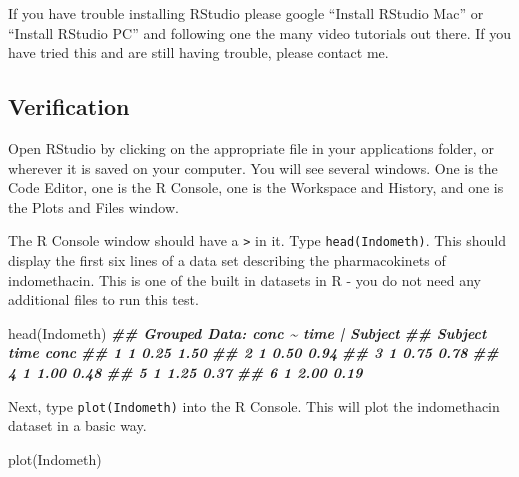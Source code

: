 \documentclass[
]{krantz}
\newenvironment{Shaded}{\begin{snugshade}}{\end{snugshade}}
\newcommand{\DocumentationTok}[1]{\textcolor[rgb]{0.56,0.35,0.01}{\textbf{\textit{#1}}}}
\newcommand{\FunctionTok}[1]{\textcolor[rgb]{0.00,0.00,0.00}{#1}}
\newcommand{\NormalTok}[1]{#1}
\begin{document}
If you have trouble installing RStudio please google ``Install RStudio Mac'' or ``Install RStudio PC'' and following one the many video tutorials out there. If you have tried this and are still having trouble, please contact me.

\hypertarget{verification}{%
\subsection{Verification}\label{verification}}

Open RStudio by clicking on the appropriate file in your applications folder, or wherever it is saved on your computer. You will see several windows. One is the Code Editor, one is the R Console, one is the Workspace and History, and one is the Plots and Files window.

The R Console window should have a \texttt{\textgreater{}} in it. Type \texttt{head(Indometh)}. This should display the first six lines of a data set describing the pharmacokinets of indomethacin. This is one of the built in datasets in R - you do not need any additional files to run this test.

\begin{Shaded}
\begin{Highlighting}[]
\FunctionTok{head}\NormalTok{(Indometh)}
\DocumentationTok{\#\# Grouped Data: conc \textasciitilde{} time | Subject}
\DocumentationTok{\#\#   Subject time conc}
\DocumentationTok{\#\# 1       1 0.25 1.50}
\DocumentationTok{\#\# 2       1 0.50 0.94}
\DocumentationTok{\#\# 3       1 0.75 0.78}
\DocumentationTok{\#\# 4       1 1.00 0.48}
\DocumentationTok{\#\# 5       1 1.25 0.37}
\DocumentationTok{\#\# 6       1 2.00 0.19}
\end{Highlighting}
\end{Shaded}

Next, type \texttt{plot(Indometh)} into the R Console. This will plot the indomethacin dataset in a basic way.

\begin{Shaded}
\begin{Highlighting}[]
\FunctionTok{plot}\NormalTok{(Indometh)}
\end{Highlighting}
\end{Shaded}
\end{document}
